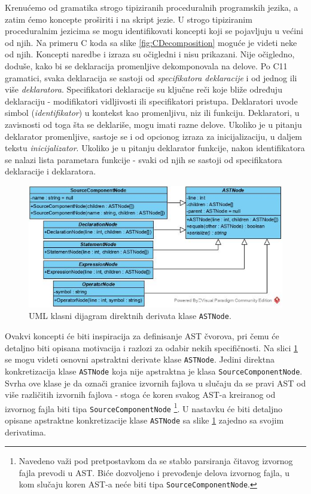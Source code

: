 Krenućemo od gramatika strogo tipiziranih proceduralnih programskih jezika, a zatim ćemo koncepte proširiti i na skript jezie. U strogo tipiziranim proceduralnim jezicima se mogu identifikovati koncepti koji se pojavljuju u većini od njih. Na primeru C koda sa slike \ref{fig:CDecomposition} moguće je videti neke od njih. Koncepti naredbe i izraza su očigledni i nisu prikazani. Nije očigledno, doduše, kako bi se deklaracija promenljive dekomponovala na delove. Po C11 gramatici, svaka deklaracija se sastoji od \emph{specifikatora deklaracije} i od jednog ili više \emph{deklaratora}. Specifikatori deklaracije su ključne reči koje bliže određuju deklaraciju - modifikatori vidljivosti ili specifikatori pristupa. Deklaratori uvode simbol (\emph{identifikator}) u kontekst kao promenljivu, niz ili funkciju. Deklaratori, u zavisnosti od toga šta se deklariše, mogu imati razne delove. Ukoliko je u pitanju deklarator promenljive, sastoje se i od opcionog izraza za inicijalizaciju, u daljem tekstu \emph{inicijalizator}. Ukoliko je u pitanju deklarator funkcije, nakon identifikatora se nalazi lista parametara funkcije - svaki od njih se sastoji od specifikatora deklaracije i deklaratora.

\begin{figure}[h!]
    \centering
        \includegraphics[scale=0.7]{images/uml/ASTNode.jpg}
    \caption{UML klasni dijagram direktnih derivata klase \texttt{ASTNode}.}
    \label{fig:UMLASTNode}
\end{figure}

Ovakvi koncepti će biti inspiracija za definisanje AST čvorova, pri čemu će detaljno biti opisana motivacija i razlozi za odabir nekih specifičnosti. Na slici \ref{fig:UMLASTNode} se mogu videti osnovni apstraktni derivate klase \texttt{ASTNode}. Jedini direktna konkretizacija klase \texttt{ASTNode} koja nije apstraktna je klasa \texttt{SourceComponentNode}. Svrha ove klase je da označi granice izvornih fajlova u slučaju da se pravi AST od više različitih izvornih fajlova - stoga će koren svakog AST-a kreiranog od izvornog fajla biti tipa \texttt{SourceComponentNode} \footnote{Navedeno važi pod pretpostavkom da se stablo parsiranja čitavog izvornog fajla prevodi u AST. Biće dozvoljeno i prevođenje delova izvornog fajla, u kom slučaju koren AST-a neće biti tipa \texttt{SourceComponentNode}.}. U nastavku će biti detaljno opisane apstraktne konkretizacije klase \texttt{ASTNode} sa slike \ref{fig:UMLASTNode} zajedno sa svojim derivatima. 






